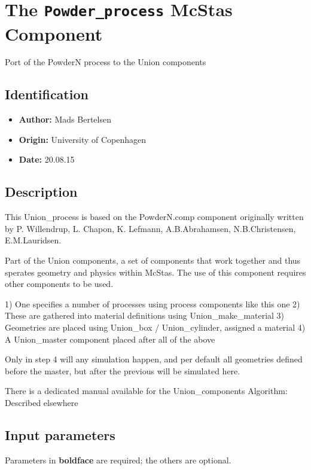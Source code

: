 \section{The \texttt{Powder\_process} McStas Component}
Port of the PowderN process to the Union components

\subsection*{Identification}
\begin{itemize}
  \item \textbf{Author:} Mads Bertelsen
  \item \textbf{Origin:} University of Copenhagen
  \item \textbf{Date:} 20.08.15
\end{itemize}

\subsection*{Description}
This Union\_process is based on the PowderN.comp component originally written by P. Willendrup, L. Chapon, K. Lefmann, A.B.Abrahamsen, N.B.Christensen, E.M.Lauridsen.

Part of the Union components, a set of components that work together and thus sperates geometry and physics within McStas. The use of this component requires other components to be used.

1) One specifies a number of processes using process components like this one 2) These are gathered into material definitions using Union\_make\_material 3) Geometries are placed using Union\_box / Union\_cylinder, assigned a material 4) A Union\_master component placed after all of the above

Only in step 4 will any simulation happen, and per default all geometries defined before the master, but after the previous will be simulated here.

There is a dedicated manual available for the Union\_components Algorithm: Described elsewhere

\subsection*{Input parameters}
Parameters in \textbf{boldface} are required; the others are optional.

